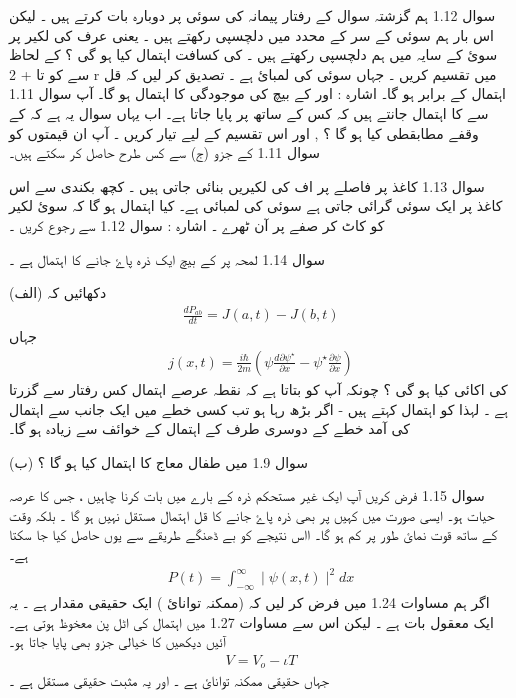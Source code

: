 

سوال 1.12  ہم گزشتہ سوال کے رفتار پیمانہ کی سوئی پر دوبارہ بات کرتے ہیں ۔ لیکن اس بار ہم سوئی کے سر کے   محدد میں دلچسپی رکھتے ہیں ۔ یعنی  عرف کی لکیر پر سوئ کے سایہ میں ہم دلچسپی رکھتے ہیں ۔  کی کسافت اہتمال کیا ہو گی ؟   کے لحاظ  سے     کو   تا  + 2 r میں تقسیم کریں ۔ جہاں  
سوئی کی لمبائ ہے ۔ تصدیق کر لیں کہ قل اہتمال  کے برابر ہو گا۔  اشارہ :   اور   کے بیچ    کی موجودگی کا اہتمال  ہو گا۔ آپ سوال 1.11 سے    کا اہتمال جانتے ہیں کہ کس کے ساتھ پر پایا جاتا ہے۔ اب یہاں سوال یہ ہے کہ   کے وقفے مطابقطی    کیا ہو گا ؟ 
,  اور  
 اس تقسیم کے لیے تیار کریں ۔ آپ ان قیمتوں کو سوال 1.11 کے جزو (ج) سے کس طرح حاصل کر سکتے ہیں۔  

سوال 1.13 کاغذ پر 
فاصلے پر اف کی لکیریں بنائی جاتی ہیں ۔ کچھ  بکندی سے اس کاغذ پر ایک سوئی گرائی جاتی ہے  سوئی کی لمبائی   ہے۔  کیا اہتمال ہو گا کہ سوئ لکیر کو کاٹ کر صفے پر آن ٹھرے ۔ اشارہ : سوال 1.12 سے رجوع کریں ۔ 

سوال 1.14  لمحہ   پر   کے بیچ ایک ذرہ پاۓ جانے کا اہتمال  ہے ۔ 

(الف) دکھائیں کہ 
\begin{align}
\frac{ dP_{ab} }{ dt } = J ( a , t ) - J ( b , t )
\end{align}
جہاں 
\begin{align}
j ( x , t ) =  \frac{ i \hbar }{ 2 m } ( \psi \frac{ d \partial \psi^\star }{ \partial x } - \psi^\star \frac{ \partial \psi }{ \partial x } )
\end{align}
کی اکائی کیا ہو گی ؟ چونکہ  آپ کو بتاتا ہے کہ نقطہ  عرصے اہتمال کس رفتار سے گزرتا ہے ۔ لہذا   کو اہتمال  کہتے ہیں - اگر  بڑھ رہا ہو تب کسی خطے میں ایک جانب سے اہتمال کی آمد خطے کے دوسری طرف کے اہتمال کے خوائف سے زیادہ ہو گا۔  

(ب) سوال 1.9 میں طفال معاج کا اہتمال  کیا ہو گا ؟ 

سوال 1.15 فرض کریں آپ ایک غیر مستحکم ذرہ کے بارے میں بات کرنا چاہیں ، جس کا عرصہ حیات 
 ہو۔ ایسی صورت میں کہیں پر بھی ذرہ پاۓ جانے کا قل اہتمال مستقل نہیں ہو گا ۔ بلکہ وقت کے ساتھ قوت نمائ طور پر کم ہو گا۔ ااس نتیجے کو بے ڈھنگے طریقے سے یوں حاصل کیا جا سکتا 
ہے۔
\begin{align}
P(t) = \int_{-\infty }^{ \infty } \mid \psi ( x , t ) \mid^2 dx
\end{align} 
اگر ہم مساوات 1.24 میں فرض کر لیں کہ 
 (ممکنہ توانائ ) ایک حقیقی مقدار ہے ۔ یہ ایک معقول بات ہے  ۔ لیکن اس سے مساوات 1.27 میں اہتمال کی اٹل پن معخوظ ہوتی ہے۔ آئیں دیکھیں
کا خیالی جزو بھی پایا جاتا ہو۔
\begin{align}
V = V_o - \iota T
\end{align}
جہاں 
 حقیقی ممکنہ توانائ ہے ۔  اور یہ مثبت حقیقی مستقل ہے ۔ 
 
